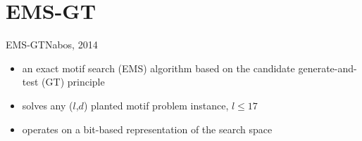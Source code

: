 \documentclass[pdf,xcolor={dvipsnames}]{beamer}
\begin{document}
\section{EMS-GT}
	\begin{frame}{EMS-GT}{Nabos, 2014}
		\begin{itemize}
		\item an exact motif search (EMS) algorithm based on the candidate generate-and-test (GT) principle\newline
		\item solves any ($l$,$d$) planted motif problem instance, $l \leq 17$ \newline
		\item operates on a bit-based representation of the search space
		\end{itemize}
		\end{frame}
\end{document}
